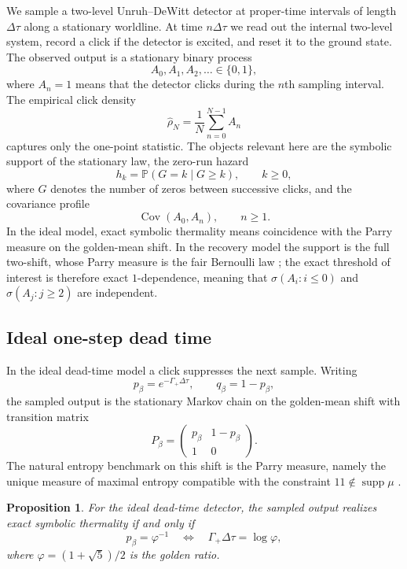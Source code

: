 \documentclass[11pt]{amsart}
\numberwithin{equation}{section}
\newtheorem{proposition}[theorem]{Proposition}
\theoremstyle{remark}
\newcommand{\PP}{\mathbb{P}}
\begin{document}
We sample a two-level Unruh--DeWitt detector at proper-time intervals of length $\Delta\tau$ along a stationary worldline. At time $n\Delta\tau$ we read out the internal two-level system, record a click if the detector is excited, and reset it to the ground state. The observed output is a stationary binary process
\[
A_0,A_1,A_2,\dots \in \{0,1\},
\]
where $A_n=1$ means that the detector clicks during the $n$th sampling interval. The empirical click density
\[
\widehat\rho_N=\frac{1}{N}\sum_{n=0}^{N-1}A_n
\]
captures only the one-point statistic. The objects relevant here are the symbolic support of the stationary law, the zero-run hazard
\[
h_k=\PP(G=k\mid G\ge k), \qquad k\ge0,
\]
where $G$ denotes the number of zeros between successive clicks, and the covariance profile
\[
\operatorname{Cov}(A_0,A_n), \qquad n\ge1.
\]
In the ideal model, exact symbolic thermality means coincidence with the Parry measure on the golden-mean shift. In the recovery model the support is the full two-shift, whose Parry measure is the fair Bernoulli law \cite{LindMarcus1995}; the exact threshold of interest is therefore exact $1$-dependence, meaning that $\sigma(A_i:i\le0)$ and $\sigma(A_j:j\ge2)$ are independent.

\subsection{Ideal one-step dead time}

In the ideal dead-time model a click suppresses the next sample. Writing
\begin{equation}\label{eq:p-beta-main}
p_\beta=e^{-\Gamma_+\Delta\tau}, \qquad q_\beta=1-p_\beta,
\end{equation}
the sampled output is the stationary Markov chain on the golden-mean shift with transition matrix
\begin{equation}\label{eq:golden-mean-main}
P_\beta=
\begin{pmatrix}
 p_\beta & 1-p_\beta \\
 1 & 0
\end{pmatrix}.
\end{equation}
The natural entropy benchmark on this shift is the Parry measure, namely the unique measure of maximal entropy compatible with the constraint $11\notin\operatorname{supp}\mu$ \cite{Parry1964,LindMarcus1995}.

\begin{proposition}\label{prop:ideal-main}
For the ideal dead-time detector, the sampled output realizes exact symbolic thermality if and only if
\begin{equation}\label{eq:parry-threshold-main}
p_\beta=\varphi^{-1}
\quad\Longleftrightarrow\quad
\Gamma_+\Delta\tau=\log\varphi,
\end{equation}
where $\varphi=(1+\sqrt5)/2$ is the golden ratio.
\end{proposition}
\end{document}
